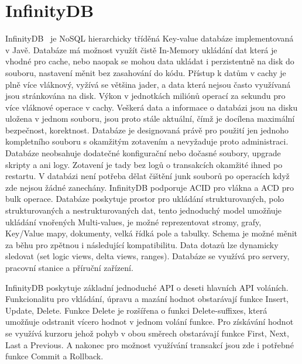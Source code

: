 \documentclass[czech,master,dept460,male,csharp,cpdeclaration]{diploma}
\begin{document}
	\section{InfinityDB}
	
	InfinityDB~\cite{infinitydb} je NoSQL hierarchicky tříděná Key-value databáze implementovaná v Javě. Databáze má možnost využít čistě In-Memory ukládání dat která je vhodné pro cache, nebo naopak se mohou data ukládat i perzistentně na disk do souboru, nastavení měnit bez zasahování do kódu. Přístup k datům v cachy je plně více vláknový, vyžívá se většina jader, a data která nejsou často využívaná jsou stránkována na disk. Výkon v jednotkách miliónů operací za sekundu pro více vláknové operace v cachy. Veškerá data a informace o databázi jsou na disku uložena v jednom souboru, jsou proto stále aktuální, čímž je docílena maximální bezpečnost, korektnost. Databáze je designovaná právě pro použití jen jednoho kompletního souboru s okamžitým zotavením a nevyžaduje proto administraci. Databáze neobsahuje dodatečné konfigurační nebo dočasné soubory, upgrade skripty a ani logy. Zotavení je tady bez logů o transakcích okamžité ihned po restartu. V databázi není potřeba dělat čištění junk souborů po operacích když zde nejsou žádné zanechány. InfinityDB podporuje ACID pro vlákna a ACD pro bulk operace. Databáze poskytuje prostor pro ukládání strukturovaných, polo strukturovaných a nestrukturovaných dat, tento jednoduchý model umožňuje ukládání vnořených Multi-values, je možné reprezentovat stromy, grafy, Key/Value mapy, dokumenty, velká řídká pole a tabulky. Schema je možné měnit za běhu pro zpětnou i následující kompatibilitu. Data dotazů lze dynamicky sledovat (set logic views, delta views, ranges). Databáze se využívá pro servery, pracovní stanice a příruční zařízení.
	
	InfinityDB poskytuje základní jednoduché API o deseti hlavních API voláních. Funkcionalitu pro vkládání, úpravu a mazání hodnot obstarávají funkce Insert, Update, Delete. Funkce Delete je rozšířena o funkci Delete-suffixes, která umožňuje odstranit vícero hodnot v jednom volání funkce. Pro získávání hodnot se využívá kurzoru jehož pohyb v obou směrech obstarávají funkce First, Next, Last a Previous. A nakonec pro možnost využívání transakcí jsou zde i potřebné funkce Commit a Rollback.
\end{document}
